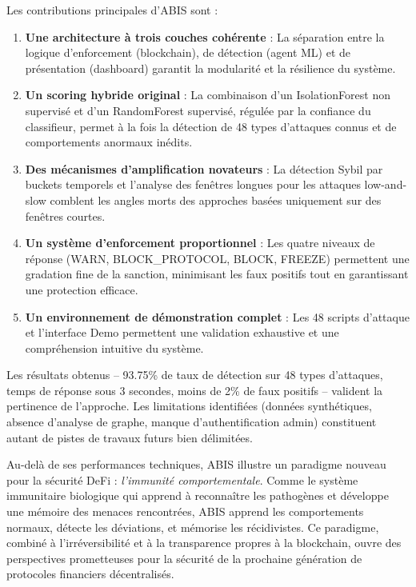 \documentclass[12pt,a4paper]{report}
\begin{document}
Les contributions principales d'ABIS sont :

\begin{enumerate}
  \item \textbf{Une architecture à trois couches cohérente} : La séparation entre la logique d'enforcement (blockchain), de détection (agent ML) et de présentation (dashboard) garantit la modularité et la résilience du système.

  \item \textbf{Un scoring hybride original} : La combinaison d'un IsolationForest non supervisé et d'un RandomForest supervisé, régulée par la confiance du classifieur, permet à la fois la détection de 48 types d'attaques connus et de comportements anormaux inédits.

  \item \textbf{Des mécanismes d'amplification novateurs} : La détection Sybil par buckets temporels et l'analyse des fenêtres longues pour les attaques low-and-slow comblent les angles morts des approches basées uniquement sur des fenêtres courtes.

  \item \textbf{Un système d'enforcement proportionnel} : Les quatre niveaux de réponse (WARN, BLOCK\_PROTOCOL, BLOCK, FREEZE) permettent une gradation fine de la sanction, minimisant les faux positifs tout en garantissant une protection efficace.

  \item \textbf{Un environnement de démonstration complet} : Les 48 scripts d'attaque et l'interface Demo permettent une validation exhaustive et une compréhension intuitive du système.
\end{enumerate}

Les résultats obtenus -- 93.75\% de taux de détection sur 48 types d'attaques, temps de réponse sous 3 secondes, moins de 2\% de faux positifs -- valident la pertinence de l'approche. Les limitations identifiées (données synthétiques, absence d'analyse de graphe, manque d'authentification admin) constituent autant de pistes de travaux futurs bien délimitées.

Au-delà de ses performances techniques, ABIS illustre un paradigme nouveau pour la sécurité DeFi : \textit{l'immunité comportementale}. Comme le système immunitaire biologique qui apprend à reconnaître les pathogènes et développe une mémoire des menaces rencontrées, ABIS apprend les comportements normaux, détecte les déviations, et mémorise les récidivistes. Ce paradigme, combiné à l'irréversibilité et à la transparence propres à la blockchain, ouvre des perspectives prometteuses pour la sécurité de la prochaine génération de protocoles financiers décentralisés.
\end{document}

